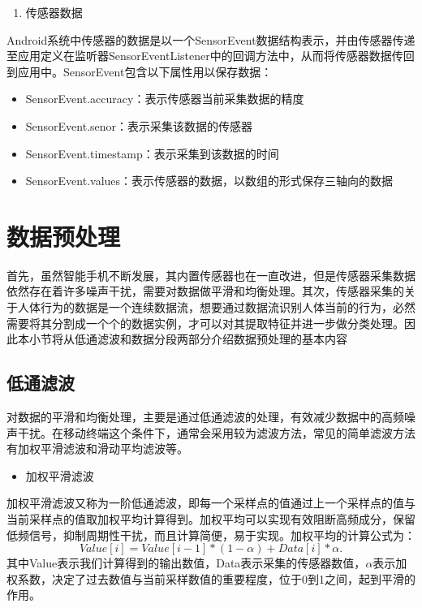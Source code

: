 \begin{enumerate}[(3)]
	\item 传感器数据
\end{enumerate}
\par Android系统中传感器的数据是以一个SensorEvent数据结构表示，并由传感器传递至应用定义在监听器SensorEventListener中的回调方法中，从而将传感器数据传回到应用中。SensorEvent包含以下属性用以保存数据：
\begin{itemize}
	\item SensorEvent.accuracy：表示传感器当前采集数据的精度
	\item SensorEvent.senor：表示采集该数据的传感器
	\item SensorEvent.timestamp：表示采集到该数据的时间
	\item SensorEvent.values：表示传感器的数据，以数组的形式保存三轴向的数据
\end{itemize}

\section{数据预处理}
\par 首先，虽然智能手机不断发展，其内置传感器也在一直改进，但是传感器采集数据依然存在着许多噪声干扰，需要对数据做平滑和均衡处理。其次，传感器采集的关于人体行为的数据是一个连续数据流，想要通过数据流识别人体当前的行为，必然需要将其分割成一个个的数据实例，才可以对其提取特征并进一步做分类处理。因此本小节将从低通滤波和数据分段两部分介绍数据预处理的基本内容

\subsection{低通滤波}
\par 对数据的平滑和均衡处理，主要是通过低通滤波的处理，有效减少数据中的高频噪声干扰。在移动终端这个条件下，通常会采用较为滤波方法，常见的简单滤波方法有加权平滑滤波和滑动平均滤波等。

\begin{itemize}
	\item 加权平滑滤波
\end{itemize}
\par 加权平滑滤波又称为一阶低通滤波，即每一个采样点的值通过上一个采样点的值与当前采样点的值取加权平均计算得到。加权平均可以实现有效阻断高频成分，保留低频信号，抑制周期性干扰，而且计算简便，易于实现。加权平均的计算公式为：
\begin{equation}
	Value[i] = Value[i-1]*(1-\alpha) + Data[i]*\alpha.
\end{equation}
其中Value表示我们计算得到的输出数值，Data表示采集的传感器数值，$\alpha$表示加权系数，决定了过去数值与当前采样数值的重要程度，位于0到1之间，起到平滑的作用。

